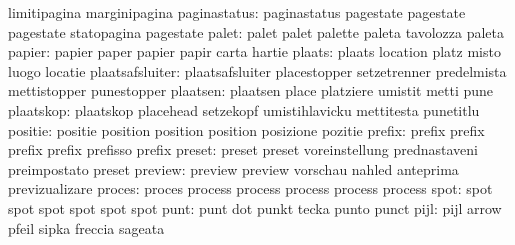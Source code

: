                           limitipagina              marginipagina
             paginastatus: paginastatus              pagestate
                           pagestate                 pagestate
                           statopagina               pagestate %
                    palet: palet                     palet
                           palette                   paleta
                           tavolozza                 paleta
                   papier: papier                    paper
                           papier                    papir
                           carta                     hartie
                   plaats: plaats                    location
                           platz                     misto
                           luogo                     locatie
          plaatsafsluiter: plaatsafsluiter           placestopper
                           setzetrenner              predelmista
                           mettistopper              punestopper %
                 plaatsen: plaatsen                  place
                           platziere                 umistit
                           metti                     pune %
                plaatskop: plaatskop                 placehead
                           setzekopf                 umistihlavicku
                           mettitesta                punetitlu %
                  positie: positie                   position
                           position                  position
                           posizione                 pozitie %
                   prefix: prefix                    prefix
                           prefix                    prefix
                           prefisso                  prefix
                   preset: preset                    preset
                           voreinstellung            prednastaveni
                           preimpostato              preset %
                  preview: preview                   preview
                           vorschau                  nahled
                           anteprima                 previzualizare
proces: proces   process
        process  process
        process  process
  spot: spot spot
        spot spot
        spot spot
                     punt: punt                      dot
                           punkt                     tecka
                           punto                     punct
                     pijl: pijl                      arrow
                           pfeil                     sipka
                           freccia                   sageata
